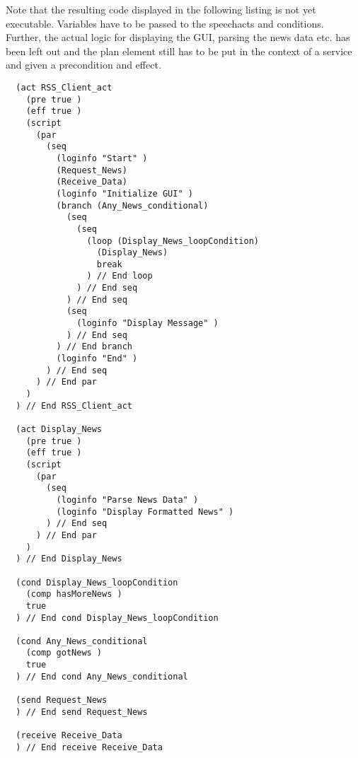 Note that the resulting code displayed in the following listing is not yet executable. Variables have to be passed to the speechacts and conditions. Further, the actual logic for displaying the GUI, parsing the news data etc. has been left out and the plan element still has to be put in the context of a service and given a precondition and effect.

\newpage
\footnotesize
\begin{verbatim}
  (act RSS_Client_act
    (pre true )
    (eff true )
    (script
      (par
        (seq
          (loginfo "Start" ) 
          (Request_News)
          (Receive_Data)
          (loginfo "Initialize GUI" ) 
          (branch (Any_News_conditional)
            (seq
              (seq
                (loop (Display_News_loopCondition)
                  (Display_News)
                  break
                ) // End loop
              ) // End seq
            ) // End seq
            (seq
              (loginfo "Display Message" ) 
            ) // End seq
          ) // End branch
          (loginfo "End" ) 
        ) // End seq
      ) // End par
    )
  ) // End RSS_Client_act

  (act Display_News
    (pre true )
    (eff true )
    (script
      (par
        (seq
          (loginfo "Parse News Data" ) 
          (loginfo "Display Formatted News" ) 
        ) // End seq
      ) // End par
    )
  ) // End Display_News

  (cond Display_News_loopCondition
    (comp hasMoreNews )
    true
  ) // End cond Display_News_loopCondition

  (cond Any_News_conditional
    (comp gotNews )
    true
  ) // End cond Any_News_conditional

  (send Request_News
  ) // End send Request_News

  (receive Receive_Data
  ) // End receive Receive_Data
\end{verbatim}
\normalsize
